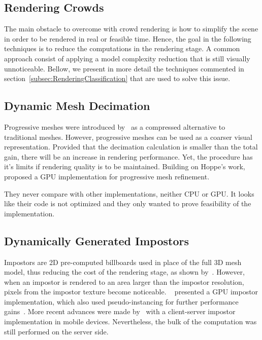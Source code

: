 \documentclass[6pt]{article}
\begin{document}
\begin{multicols}{2}
\section{Rendering Crowds}

The main obstacle to overcome with crowd rendering is how to simplify the scene in order to be rendered in real or feasible time.
Hence, the goal in the following techniques is to reduce the computations in the rendering stage.
A common approach consist of applying a model complexity reduction that is still visually unnoticeable.
Bellow, we present in more detail the techniques commented in section~\ref{subsec:RenderingClassification} that are used to solve this issue.

\subsection{Dynamic Mesh Decimation}

Progressive meshes were introduced by~\cite{Hoppe1996} as a compressed alternative to traditional meshes.
However, progressive meshes can be used as a coarser visual representation.
Provided that the decimation calculation is smaller than the total gain, there will be an increase in rendering performance.
Yet, the procedure has it's limits if rendering quality is to be maintained.
Building on Hoppe's work, \cite{Hu2009} proposed a GPU implementation for progressive mesh refinement.

They never compare with other implementations, neither CPU or GPU.
It looks like their code is not optimized and they only wanted to prove feasibility of the implementation. 

\subsection{Dynamically Generated Impostors}
\label{subsec:DimGenImpostors}

Impostors are 2D pre-computed billboards used in place of the full 3D mesh model, thus reducing the cost of the rendering stage, as shown by~\cite{Aubel2000}.
However, when an impostor is rendered to an area larger than the impostor resolution, pixels from the impostor texture become noticeable.
~\cite{Millan2006} presented a GPU impostor implementation, which also used pseudo-instancing for further performance gains~\cite{zelsnack2004glsl}.
More recent advances were made by~\cite{Ghiletiuc2013} with a client-server impostor implementation in mobile devices.
Nevertheless, the bulk of the computation was still performed on the server side.


\end{multicols}
\end{document}
